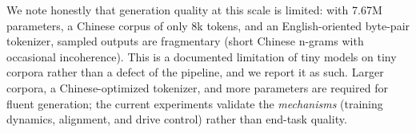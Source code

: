 We note honestly that generation quality at this scale is limited: with 7.67M
parameters, a Chinese corpus of only 8k tokens, and an English-oriented
byte-pair tokenizer, sampled outputs are fragmentary (short Chinese n-grams
with occasional incoherence). This is a documented limitation of tiny models on
tiny corpora rather than a defect of the pipeline, and we report it as such.
Larger corpora, a Chinese-optimized tokenizer, and more parameters are required
for fluent generation; the current experiments validate the \emph{mechanisms}
(training dynamics, alignment, and drive control) rather than end-task quality.
